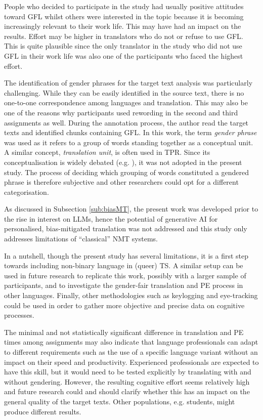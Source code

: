 People who decided to participate in the study had usually positive attitudes toward GFL whilst others were interested in the topic because it is becoming increasingly relevant to their work life. This may have had an impact on the results. Effort may be higher in translators who do not or refuse to use GFL. This is quite plausible since the only translator in the study who did not use GFL in their work life was also one of the participants who faced the highest effort. 

The identification of gender phrases for the target text analysis was particularly challenging. While they can be easily identified in the source text, there is no one-to-one correspondence among languages and translation. This may also be one of the reasons why participants used rewording in the second and third assignments as well. During the annotation process, the author read the target texts and identified chunks containing GFL. In this work, the term \textit{gender phrase} was used as it refers to a group of words standing together as a conceptual unit. A similar concept, \textit{translation unit}, is often used in TPR. Since its conceptualisation is widely debated (e.g. \cite{carl2011gazing}), it was not adopted in the present study. The process of deciding which grouping of words constituted a gendered phrase is therefore subjective and other researchers could opt for a different categorisation. 

As discussed in Subsection \ref{sub:biasMT}, the present work was developed prior to the rise in interest on LLMs, hence the potential of generative AI for personalised, bias-mitigated translation was not addressed and this study only addresses limitations of ``classical'' NMT systems.

In a nutshell, though the present study has several limitations, it is a first step towards including non-binary language in (queer) TS. A similar setup can be used in future research to replicate this work, possibly with a larger sample of participants, and to investigate the gender-fair translation and PE process in other languages. Finally, other methodologies such as keylogging and eye-tracking could be used in order to gather more objective and precise data on cognitive processes. 

The minimal and not statistically significant difference in translation and PE times among assignments may also indicate that language professionals can adapt to different requirements such as the use of a specific language variant without an impact on their speed and productivity. Experienced professionals are expected to have this skill, but it would need to be tested explicitly by translating with and without gendering. However, the resulting cognitive effort seems relatively high and future research could and should clarify whether this has an impact on the general quality of the target texts. Other populations, e.g. students, might produce different results.

